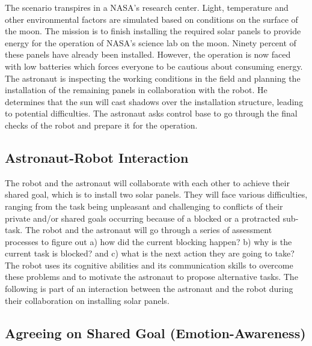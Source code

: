 The scenario transpires in a NASA's research center. Light, temperature and
other environmental factors are simulated based on conditions on the surface of
the moon. The mission is to finish installing the required solar panels to
provide energy for the operation of NASA's science lab on the moon. Ninety
percent of these panels have already been installed. However, the operation is
now faced with low batteries which forces everyone to be cautious about
consuming energy. The astronaut is inspecting the working conditions in the
field and planning the installation of the remaining panels in collaboration
with the robot. He determines that the sun will cast shadows over the
installation structure, leading to potential difficulties. The astronaut asks
control base to go through the final checks of the robot and prepare it for the
operation.

\subsection{Astronaut-Robot Interaction}

The robot and the astronaut will collaborate with each other to achieve their
shared goal, which is to install two solar panels. They will face various
difficulties, ranging from the task being unpleasant and challenging to
conflicts of their private and/or shared goals occurring because of a blocked or
a protracted sub-task. The robot and the astronaut will go through a series of
assessment processes to figure out a) how did the current blocking happen? b)
why is the current task is blocked? and c) what is the next action they are
going to take? The robot uses its cognitive abilities and its communication
skills to overcome these problems and to motivate the astronaut to propose
alternative tasks. The following is part of an interaction between the astronaut
and the robot during their collaboration on installing solar panels.

\subsection{Agreeing on Shared Goal (Emotion-Awareness)}
\label{sec:exp1}

